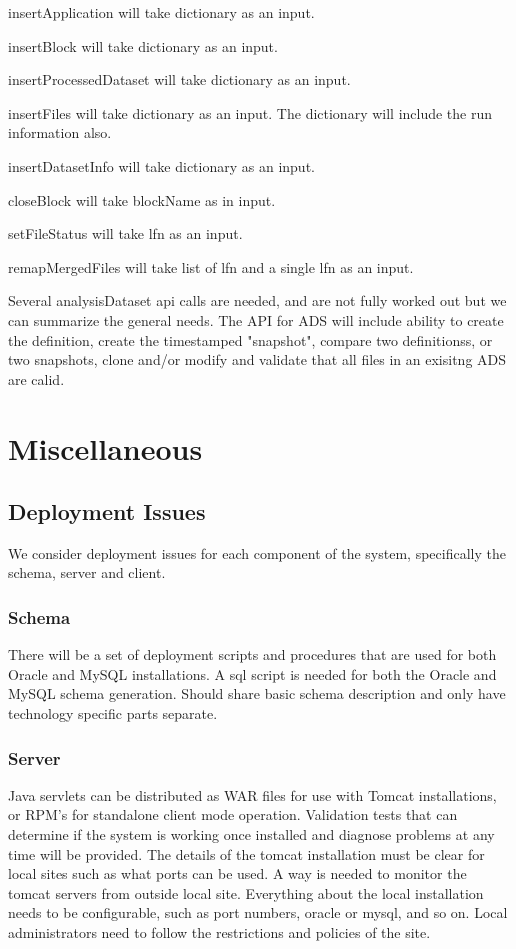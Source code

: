 \documentclass{cmspaper}
\begin{document}
\begin{description}
   \item{insertApplication} will take dictionary as an input.
   \item{insertBlock} will take dictionary as an input.
   \item{insertProcessedDataset} will take dictionary as an input.
   \item{insertFiles} will take dictionary as an input. The dictionary will include the run information also.
   \item{insertDatasetInfo} will take dictionary as an input.
   \item{closeBlock} will take blockName as in input.
   \item{setFileStatus} will take lfn as an input.
   \item{remapMergedFiles} will take list of lfn and a single lfn as an input.
\end{description}

Several analysisDataset api calls are needed, and are not fully worked out but we can summarize the general needs. The API for ADS will include ability to create the definition, create the timestamped "snapshot", compare two definitionss, or two snapshots, clone and/or modify and validate that all files in an exisitng ADS are calid.





\section{Miscellaneous}
\subsection{Deployment Issues}
We consider deployment issues for each component of the system, specifically the schema, server and client. 
\subsubsection{Schema}
There will be a set of deployment scripts and procedures that are used for both Oracle and MySQL installations. A sql script is needed for both the Oracle and MySQL schema generation. Should share basic schema description and only have technology specific parts separate.
   
\subsubsection{Server}
  Java servlets can be distributed as WAR files for use with Tomcat installations,  or  RPM's for standalone client mode operation. Validation tests that can determine if the system is working once installed and diagnose problems at any time will be provided. The details of the tomcat installation must be clear for local sites such as what ports can be used. A way is needed to monitor the tomcat servers from outside local site. Everything about the local installation needs to be configurable, such as port numbers, oracle or mysql, and so on. Local administrators need to follow the restrictions and policies of the site.
\end{document}
